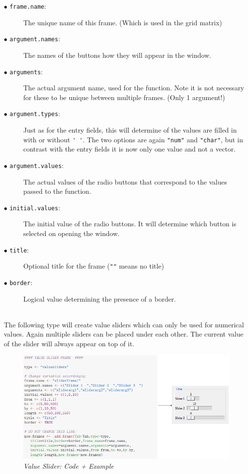 \documentclass[a4paper]{article}\usepackage[]{graphicx}\usepackage[]{color}
\begin{document}
\begin{description}
  \item[$\bullet$ \texttt{frame.name}:] The unique name of this frame. (Which is used in the grid matrix)
  \item[$\bullet$ \texttt{argument.names}:] The names of the buttons how they
  will appear in the window.
  \item[$\bullet$ \texttt{arguments}:] The actual argument name, used for the
  function. Note it is not necessary for these to be unique between multiple
  frames. (Only 1 argument!)
  \item[$\bullet$ \texttt{argument.types}:] Just as for the entry fields, this
  will determine of the values are filled in with or without \verb|' '|. The two
  options are again \verb|"num"| and \verb|"char"|, but in contrast with the entry
  fields it is now only one value and not a vector.
  \item[$\bullet$ \texttt{argument.values}:] The actual values of the radio buttons 
that correspond to the values passed to the function. 
    \item[$\bullet$ \texttt{initial.values}:] The initial value of the radio
  buttons. It will determine which button is selected on opening the window.
  \item[$\bullet$ \texttt{title}:] Optional title for the frame (\verb|""| means no title)
  \item[$\bullet$ \texttt{border}:] Logical value determining the presence of a
  border.   

\end{description}

\\
The following type will create value sliders which can only be used for
numerical values. Again multiple sliders can be placed under each other. The
current value of the slider will always appear on top of it.

\begin{figure}[H]
\centering
\includegraphics[scale=0.5]{figures/slider.png}
\caption{{\it Value Slider: Code + Example}
\label{radiobuttons}}
\end{figure}
\end{document}
